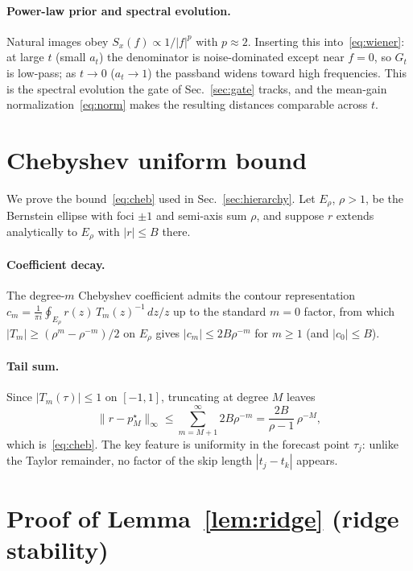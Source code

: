 \documentclass[10pt,twocolumn,letterpaper]{article}
\begin{document}
\paragraph{Power-law prior and spectral evolution.}
Natural images obey $S_x(f) \propto 1/|f|^p$ with $p \approx 2$.
Inserting this into~\eqref{eq:wiener}: at large $t$ (small $a_t$) the
denominator is noise-dominated except near $f = 0$, so $G_t$ is low-pass;
as $t \to 0$ ($a_t \to 1$) the passband widens toward high frequencies.
This is the spectral evolution the gate of Sec.~\ref{sec:gate} tracks, and
the mean-gain normalization~\eqref{eq:norm} makes the resulting distances
comparable across $t$.

\section{Chebyshev uniform bound}
\label{app:cheb}

We prove the bound~\eqref{eq:cheb} used in Sec.~\ref{sec:hierarchy}.
Let $E_\rho$, $\rho > 1$, be the Bernstein ellipse with foci $\pm 1$ and
semi-axis sum $\rho$, and suppose $r$ extends analytically to $E_\rho$
with $|r| \le B$ there.

\paragraph{Coefficient decay.} The degree-$m$ Chebyshev coefficient admits
the contour representation
$c_m = \frac{1}{\pi i}\oint_{E_\rho} r(z)\,T_m(z)^{-1}\,dz/z$ up to the
standard $m=0$ factor, from which $|T_m| \ge (\rho^m - \rho^{-m})/2$ on
$E_\rho$ gives $|c_m| \le 2B\rho^{-m}$ for $m \ge 1$ (and $|c_0| \le B$).

\paragraph{Tail sum.} Since $|T_m(\tau)| \le 1$ on $[-1,1]$, truncating at
degree $M$ leaves
\begin{equation}
  \|r - p_M^\star\|_\infty \le \sum_{m=M+1}^{\infty} 2B\rho^{-m}
  = \frac{2B}{\rho - 1}\,\rho^{-M},
\end{equation}
which is~\eqref{eq:cheb}. The key feature is uniformity in the forecast
point $\tau_j$: unlike the Taylor remainder, no factor of the skip length
$|t_j - t_k|$ appears.

\section{Proof of Lemma~\ref{lem:ridge} (ridge stability)}
\label{app:ridge}
\end{document}
